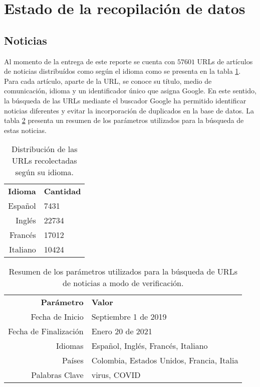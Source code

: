 \section{Estado de la recopilación de datos}


\subsection{Noticias}
Al momento de la entrega de este reporte se cuenta con $57601$ URLs de artículos de noticias distribuídos como según el idioma como se presenta en la tabla \ref{tab:news_results}. Para cada artículo, aparte de la URL, se conoce su título, medio de comunicación, idioma y un identificador único que asigna Google. En este sentido, la búsqueda de las URLs mediante el buscador Google ha permitido identificar noticias diferentes y evitar la incorporación de duplicados en la base de datos. La tabla \ref{tab:news_parameters} presenta un resumen de los parámetros utilizados para la búsqueda de estas noticias.

\begin{table}[h]
    \centering
    \begin{tabular}{r|l}
        \textbf{Idioma} & \textbf{Cantidad} \\
        Español & 7431 \\
        Inglés & 22734 \\
        Francés & 17012 \\
        Italiano & 10424
    \end{tabular}
    \caption{Distribución de las URLs recolectadas según su idioma.}
    \label{tab:news_results}
\end{table}

\begin{table}[h]
    \centering
    \begin{tabular}{r|l}
        \textbf{Parámetro} & \textbf{Valor} \\
        Fecha de Inicio & Septiembre 1 de 2019 \\
        Fecha de Finalización & Enero 20 de 2021 \\
        Idiomas & Español, Inglés, Francés, Italiano \\
        Países & Colombia, Estados Unidos, Francia, Italia \\
        Palabras Clave & virus, COVID
    \end{tabular}
    \caption{Resumen de los parámetros utilizados para la búsqueda de URLs de noticias a modo de verificación.}
    \label{tab:news_parameters}
\end{table}

